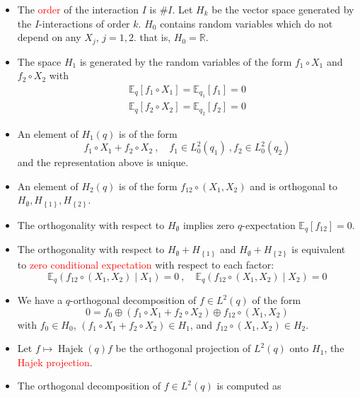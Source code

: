 \documentclass[xcolor=svgnames]{beamer}
\DeclareMathOperator{\Hajek}{Hajek}
\newcommand{\condexpat}[3]{\mathbb E_{#1}\left(#2 \middle| #3\right)}
\newcommand{\expectat}[2]{\mathbb E_{#1}\left[#2\right]}
\newcommand{\hajekof}[1]{\Hajek\left(#1\right)}
\newcommand{\reals}{\mathbb{R}}
\newcommand{\rosso}[1]{\textcolor{red}{#1}}
\newcommand{\set}[1]{\left\{#1\right\}}
\renewcommand{\emph}{\rosso}
\begin{document}
\begin{frame}
\begin{itemize}
    \item The \emph{order} of the interaction $I$ is $\# I$. Let $H_k$ be the vector space generated by the $I$-interactions of order $k$. $H_0$ contains random variables which do not depend on any $X_j$, $j=1,2$. that is, $H_0 = \reals$.
    \item The space $H_1$ is generated by the random variables of the form 
        $f_1\circ X_1$ and $f_2\circ X_2$
    with 
    \begin{gather*}
        \expectat q {f_1\circ X_1} = \expectat {q_1} {f_1} = 0 \\
           \expectat q {f_2\circ X_2} = \expectat {q_2} {f_2} = 0 
    \end{gather*}
   \item An element of $H_1(q)$ is of the form
   \begin{equation*}
       f_1\circ X_1 + f_2 \circ X_2 \ , \quad f_1 \in L^2_0(q_1) \ , f_2 \in L^2_0(q_2)
   \end{equation*}
  and the representation above is unique. 
\item An element of $H_2(q)$ is of the form $f_{12} \circ(X_1,X_2)$ and is orthogonal to $H_{\emptyset}, H_{\set{1}}, H_{\set{2}}$.
\item The orthogonality with respect to $H_{\emptyset}$ implies zero $q$-expectation $\expectat q {f_{12}} = 0$.
  \item The orthogonality with respect to $H_{\emptyset} + H_{\set{1}}$ and $H_{\emptyset} + H_{\set{2}}$ is equivalent to \emph{zero conditional expectation} with respect to each factor:
   \begin{equation*}
       \condexpat {q} {f_{12} \circ (X_1,X_2)}{X_1} = 0 \ , \quad \condexpat {q} {f_{12} \circ (X_1,X_2)}{X_2} = 0
   \end{equation*}
    \item We have a $q$-orthogonal decomposition of $f \in L^2(q)$ of the form
    \begin{equation*}
    0 = f_0 \oplus (f_1\circ X_1 + f_2\circ X_2) \oplus f_{12}\circ (X_1,X_2)
    \end{equation*}
    with $f_0 \in H_0$, $(f_1\circ X_1 + f_2\circ X_2) \in H_1$, and $f_{12}\circ (X_1,X_2) \in H_2$. 
    \item Let $f \mapsto \hajekof q f$ be the orthogonal projection of $L^2(q)$ onto $H_1$, the \emph{Hajek projection}.
    \item The orthogonal decomposition of $f \in L^2(q)$ is computed as
    \begin{equation*}

\end{equation*}
\end{itemize}
\end{frame}
\end{document}

